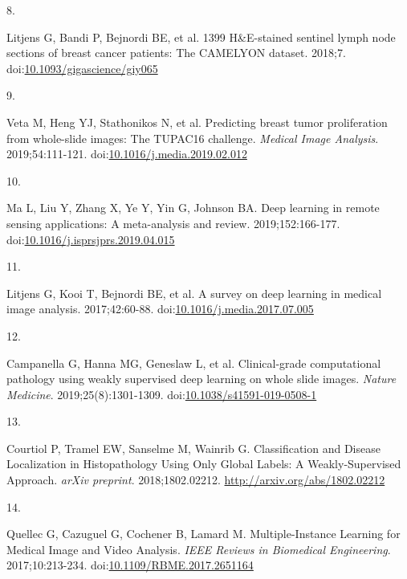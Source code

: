 \documentclass[
  12pt,
  a5,margin=2cmpaper,
]{article}
\newlength{\cslhangindent}
\newlength{\csllabelwidth}
\newlength{\cslentryspacingunit} %
\newenvironment{CSLReferences}[2] %
 {%
  \setlength{\parindent}{0pt}
  \ifodd #1
  \let\oldpar\par
  \def\par{\hangindent=\cslhangindent\oldpar}
  \fi
  \setlength{\parskip}{#2\cslentryspacingunit}
 }%
 {}
\newcommand{\CSLLeftMargin}[1]{\parbox[t]{\csllabelwidth}{#1}}
\newcommand{\CSLRightInline}[1]{\parbox[t]{\linewidth - \csllabelwidth}{#1}\break}
\begin{document}
\begin{CSLReferences}{0}{0}
\leavevmode{}%
\CSLLeftMargin{8. }%
\CSLRightInline{Litjens G, Bandi P, Bejnordi BE, et al. {1399
H{\&}E-stained sentinel lymph node sections of breast cancer patients:
The CAMELYON dataset}. 2018;7.
doi:\href{https://doi.org/10.1093/gigascience/giy065}{10.1093/gigascience/giy065}}

\leavevmode{}%
\CSLLeftMargin{9. }%
\CSLRightInline{Veta M, Heng YJ, Stathonikos N, et al. {Predicting
breast tumor proliferation from whole-slide images: The TUPAC16
challenge}. \emph{Medical Image Analysis}. 2019;54:111-121.
doi:\href{https://doi.org/10.1016/j.media.2019.02.012}{10.1016/j.media.2019.02.012}}

\leavevmode{}%
\CSLLeftMargin{10. }%
\CSLRightInline{Ma L, Liu Y, Zhang X, Ye Y, Yin G, Johnson BA. {Deep
learning in remote sensing applications: A meta-analysis and review}.
2019;152:166-177.
doi:\href{https://doi.org/10.1016/j.isprsjprs.2019.04.015}{10.1016/j.isprsjprs.2019.04.015}}

\leavevmode{}%
\CSLLeftMargin{11. }%
\CSLRightInline{Litjens G, Kooi T, Bejnordi BE, et al. {A survey on deep
learning in medical image analysis}. 2017;42:60-88.
doi:\href{https://doi.org/10.1016/j.media.2017.07.005}{10.1016/j.media.2017.07.005}}

\leavevmode{}%
\CSLLeftMargin{12. }%
\CSLRightInline{Campanella G, Hanna MG, Geneslaw L, et al.
{Clinical-grade computational pathology using weakly supervised deep
learning on whole slide images}. \emph{Nature Medicine}.
2019;25(8):1301-1309.
doi:\href{https://doi.org/10.1038/s41591-019-0508-1}{10.1038/s41591-019-0508-1}}

\leavevmode{}%
\CSLLeftMargin{13. }%
\CSLRightInline{Courtiol P, Tramel EW, Sanselme M, Wainrib G.
{Classification and Disease Localization in Histopathology Using Only
Global Labels: A Weakly-Supervised Approach}. \emph{arXiv preprint}.
2018;1802.02212. \url{http://arxiv.org/abs/1802.02212}}

\leavevmode{}%
\CSLLeftMargin{14. }%
\CSLRightInline{Quellec G, Cazuguel G, Cochener B, Lamard M.
{Multiple-Instance Learning for Medical Image and Video Analysis}.
\emph{IEEE Reviews in Biomedical Engineering}. 2017;10:213-234.
doi:\href{https://doi.org/10.1109/RBME.2017.2651164}{10.1109/RBME.2017.2651164}}


\end{CSLReferences}
\end{document}
